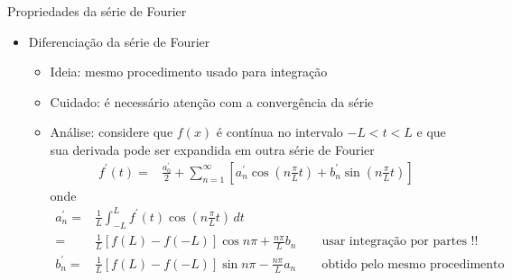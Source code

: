       \begin{slide}[toc = ]{Propriedades da série de Fourier}
	      \begin{itemize}
		      \item Diferenciação da série de Fourier
			      \begin{itemize}
				      \item Ideia: mesmo procedimento usado para integração
				      \item Cuidado: é necessário atenção com a convergência da série
				      \item Análise: considere que $f(x)$ é contínua no intervalo $-L<t<L$ e que sua derivada pode ser expandida em outra série de Fourier
					      \begin{align*}
						      f^\prime (t) =& \frac{a_0^\prime}{2} + \sum_{n=1}^\infty \left [ a_n^\prime  \cos \left ( n\frac{\pi}{L}t \right ) + b_n^\prime \sin \left ( n\frac{\pi}{L}t \right )\right ]
					      \end{align*}
					      onde 
					      \begin{align*}
						      a_n^\prime =& \frac{1}{L}\int_{-L}^Lf^\prime (t) \cos\left (n\frac{\pi}{L}t\right )\, dt \\
						                 =& \frac{1}{L}\left [f(L) - f(-L)\right ] \cos n\pi + \frac{n\pi}{L}b_n \qquad\text{usar integração por partes !!}\\
								 b_n^\prime =& \frac{1}{L}\left [f(L) - f(-L)\right ] \sin n\pi - \frac{n\pi}{L}a_n \qquad\text{obtido pelo mesmo procedimento}
					      \end{align*}
			      \end{itemize}
	      \end{itemize}
      \end{slide}


